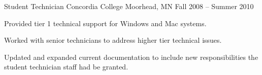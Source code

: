 \cventry
{Student Technician} %
{Concordia College} %
{Moorhead, MN} %
{Fall 2008 – Summer 2010} %
{
  	\begin{cvitems} %
        \item {Provided tier 1 technical support for Windows and Mac systems.}
		\item {Worked with senior technicians to address higher tier technical issues.}
		\item {Updated and expanded current documentation to include new responsibilities the student technician staff had be granted.}
	\end{cvitems}
}